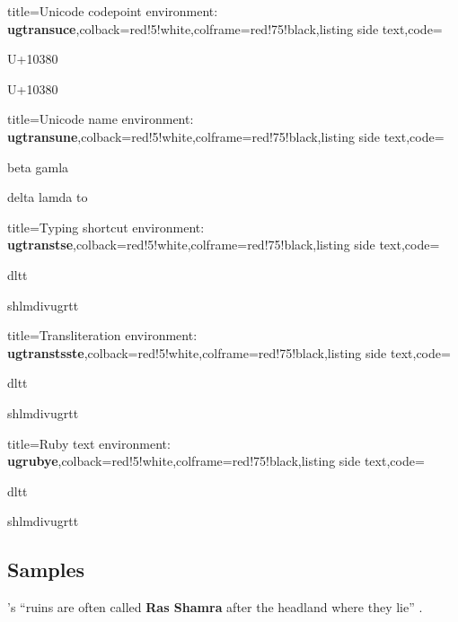 \bigskip
\begin{tcblisting}{title={{\sffamily Unicode codepoint environment: \bfseries\textcolor{blue!10}{ugtransuce}}},colback=red!5!white,colframe=red!75!black,listing side text,code={\marginpar{\p}}}
\begin{ugtransuce}
U+10380

U+10380
\end{ugtransuce}
\end{tcblisting}

\bigskip
\begin{tcblisting}{title={{\sffamily Unicode name environment: \bfseries\textcolor{blue!10}{ugtransune}}},colback=red!5!white,colframe=red!75!black,listing side text,code={\marginpar{\p}}}
\begin{ugtransune}
beta gamla

delta lamda to
\end{ugtransune}
\end{tcblisting}


\bigskip
\begin{tcblisting}{title={{\sffamily Typing shortcut environment: \bfseries\textcolor{blue!10}{ugtranstse}}},colback=red!5!white,colframe=red!75!black,listing side text,code={\marginpar{\p}}}
\begin{ugtranstse}
dltt

shlmdivugrtt
\end{ugtranstse}
\end{tcblisting}

\bigskip
\begin{tcblisting}{title={{\sffamily Transliteration environment: \bfseries\textcolor{blue!10}{ugtranstsste}}},colback=red!5!white,colframe=red!75!black,listing side text,code={\marginpar{\p}}}
\begin{ugtranstsste}
dltt

shlmdivugrtt
\end{ugtranstsste}
\end{tcblisting}


\bigskip
\begin{tcblisting}{title={{\sffamily Ruby text environment: \bfseries\textcolor{blue!10}{ugrubye}}},colback=red!5!white,colframe=red!75!black,listing side text,code={\marginpar{\p}}}
\begin{ugrubye}
dltt

shlmdivugrtt
\end{ugrubye}
\end{tcblisting}


\subsection{Samples}
's ``ruins are often called \textbf{Ras Shamra} after the headland where they lie'' \autocite{o1}.

